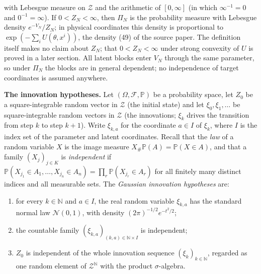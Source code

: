 \documentclass[11pt,a4paper]{report}
\begin{document}
with Lebesgue measure on \(\mathcal Z\) and the arithmetic of \([0,\infty]\) (in which \(\infty^{-1}=0\) and \(0^{-1}=\infty\)). If \(0<Z_N<\infty\), then \(\Pi_N\) is the probability measure with Lebesgue density \(e^{-V_N}/Z_N\); in physical coordinates this density is proportional to \(\exp(-\sum_iU(\theta,x^i))\), the density (49) of the source paper. The definition itself makes no claim about \(Z_N\); that \(0<Z_N<\infty\) under strong convexity of \(U\) is proved in a later section. All latent blocks enter \(V_N\) through the same parameter, so under \(\Pi_N\) the blocks are in general dependent; no independence of target coordinates is assumed anywhere.




\textbf{The innovation hypotheses.} Let \((\Omega,\mathcal F,\mathbb P)\) be a probability space, let \(Z_0\) be a square-integrable random vector in \(\mathcal Z\) (the initial state) and let \(\xi_0,\xi_1,\dots\) be square-integrable random vectors in \(\mathcal Z\) (the innovations; \(\xi_k\) drives the transition from step \(k\) to step \(k+1\)). Write \(\xi_{k,a}\) for the coordinate \(a\in I\) of \(\xi_k\), where \(I\) is the index set of the parameter and latent coordinates. Recall that the \emph{law} of a random variable \(X\) is the image measure \(X_\#\mathbb P(A)=\mathbb P(X\in A)\), and that a family \((X_j)_{j\in K}\) is \emph{independent} if \(\mathbb P(X_{j_1}\in A_1,\dots,X_{j_n}\in A_n)=\prod_r\mathbb P(X_{j_r}\in A_r)\) for all finitely many distinct indices and all measurable sets. The \emph{Gaussian innovation hypotheses} are:



\begin{enumerate}


\item for every \(k\in\mathbb N\) and \(a\in I\), the real random variable \(\xi_{k,a}\) has the standard normal law \(\mathcal N(0,1)\), with density \((2\pi)^{-1/2}e^{-t^2/2}\);

\item the countable family \((\xi_{k,a})_{(k,a)\in\mathbb N\times I}\) is independent;

\item \(Z_0\) is independent of the whole innovation sequence \((\xi_k)_{k\in\mathbb N}\), regarded as one random element of \(\mathcal Z^{\mathbb N}\) with the product \(\sigma\)-algebra.

\end{enumerate}
\end{document}

